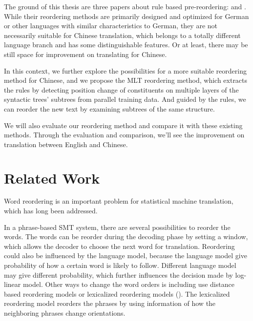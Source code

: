 The ground of this thesis are three papers about rule based pre-reordering: \cite{short, long} and \cite{tree}. While their reordering methods are primarily designed and optimized for German or other languages with similar characteristics to German, they are not necessarily suitable for Chinese translation, which belongs to a totally different language branch and has some distinguishable features. Or at least, there may be still space for improvement on translating for Chinese.

In this context, we further explore the possibilities for a more suitable reordering method for Chinese, and we propose the MLT reordering method, which extracts the rules by detecting position change of constituents on multiple layers of the syntactic trees' subtrees from parallel training data. And guided by the rules, we can reorder the new text by examining subtrees of the same structure.

We will also evaluate our reordering method and compare it with these existing methods. Through the evaluation and comparison, we'll see the improvement on translation between English and Chinese. 




\section{Related Work}
\label{ch:Introduction:sec:RelatedWork}

Word reordering is an important problem for statistical machine translation, which has long been addressed.

In a phrase-based SMT system, there are several possibilities to reorder the words. The words can be reorder during the decoding phase by setting a window, which allows the decoder to choose the next word for translation. Reordering could also be influenced by the language model, because the language model give probability of how a certain word is likely to follow. Different language model may give different probability, which further influences the decision made by log-linear model. Other ways to change the word orders is including use distance based reordering models or lexicalized reordering models (\cite{tillmann2004, koehn2005}). The lexicalized reordering model reorders the phrases by using information of how the neighboring phrases change orientations.

